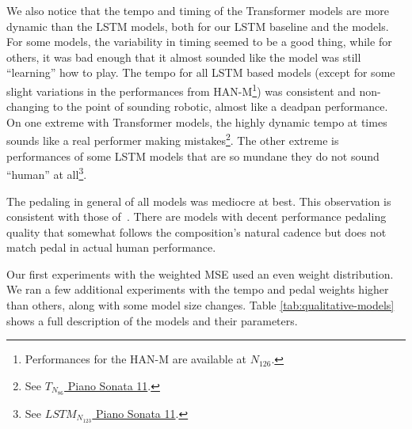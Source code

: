 \newcommand{\lm}[1]{$LSTM_{N_{#1}}$}

We also notice that the tempo and timing of the Transformer models are more dynamic than the LSTM models, both for our LSTM baseline and the \vnet{} models. For some models, the variability in timing seemed to be a good thing, while for others, it was bad enough that it almost sounded like the model was still ``learning'' how to play. The tempo for all LSTM based models (except for some slight variations in the performances from HAN-M\footnote{Performances for the HAN-M are available at \href{https://ui.neptune.ai/richt3211/thesis/e/THESIS-162/artifacts}{$N_{126}$}.}) was consistent and non-changing to the point of sounding robotic, almost like a deadpan performance. On one extreme with Transformer models, the highly dynamic tempo at times sounds like a real performer making mistakes\footnote{See \href{https://ui.neptune.ai/richt3211/thesis/e/THESIS-86/artifacts}{$T_{N_{86}}$ Piano Sonata 11}.}. The other extreme is performances of some LSTM models that are so mundane they do not sound ``human'' at all\footnote{See \href{https://ui.neptune.ai/richt3211/thesis/e/THESIS-123/artifacts}{\lm{123} Piano Sonata 11}.}. 

The pedaling in general of all models was mediocre at best. This observation is consistent with those of~\citet{jeong2019virtuosonet}. There are models with decent performance pedaling quality that somewhat follows the composition's natural cadence but does not match pedal in actual human performance. 

Our first experiments with the weighted MSE used an even weight distribution. We ran a few additional experiments with the tempo and pedal weights higher than others, along with some model size changes. Table \ref{tab:qualitative-models} shows a full description of the models and their parameters.

\newcommand{\am}{$AM$}

